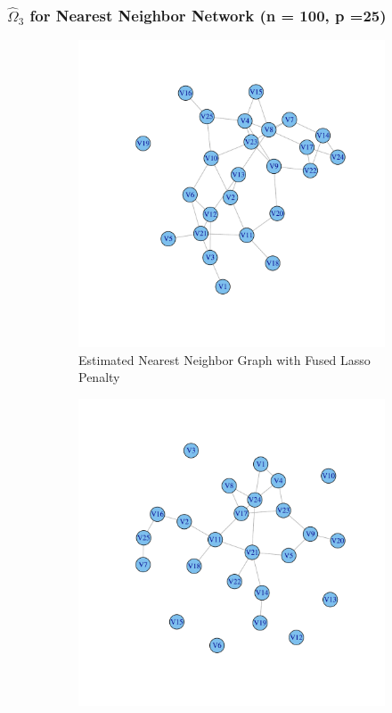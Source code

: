 \documentclass[t]{beamer}
\begin{document}
\begin{frame}
\frametitle{$\hat{\Omega}_3$ for Nearest Neighbor Network (n = 100, p =25)}
\begin{figure}
\centering 
\begin{subfigure}[b]{0.40\textwidth}
  \includegraphics[scale=0.15]{Omega3hat-f.pdf}
  \caption{Estimated Nearest Neighbor Graph with Fused Lasso Penalty}
\label{fig:nearestgaphsestimate}
\end{subfigure}
\begin{subfigure}[b]{0.40\textwidth}
  \includegraphics[scale=0.15]{Omega3hat-g.pdf}

\end{subfigure}
\end{figure}
\end{frame}
\end{document}
